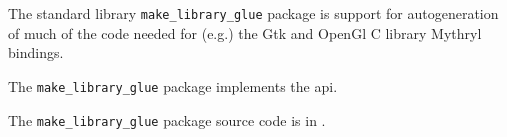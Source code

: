 
The standard library {\tt make\_library\_glue} package is support for autogeneration of much of the code needed for (e.g.) the Gtk and OpenGl C library Mythryl bindings.

The {\tt make\_library\_glue} package implements the  api.

The {\tt make\_library\_glue} package source code is in .



